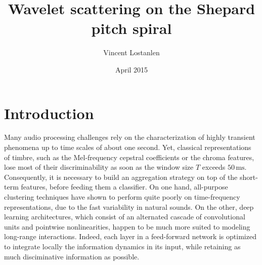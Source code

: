 \documentclass{article}
\title{Wavelet scattering on the Shepard pitch spiral}
\author{Vincent Lostanlen}
\date{April 2015}
\begin{document}
\maketitle

\section{Introduction}

Many audio processing challenges rely on the characterization of highly transient phenomena up to time scales of about one second.
Yet, classical representations of timbre, such as the Mel-frequency cepstral coefficients or the chroma features, lose most of their discriminability as soon as the window size $T$ exceeds $50\,\mathrm{ms}$.
Consequently, it is necessary to build an aggregation strategy on top of the short-term features, before feeding them a classifier.
On one hand, all-purpose clustering techniques have shown to perform quite poorly on time-frequency representations, due to the fast variability in natural sounds.
On the other, deep learning architectures, which consist of an alternated cascade of convolutional units and pointwise nonlinearities, happen to be much more suited to modeling long-range interactions.
Indeed, each layer in a feed-forward network is optimized to integrate locally the information dynamics in its input, while retaining as much disciminative information as possible.
\end{document}
